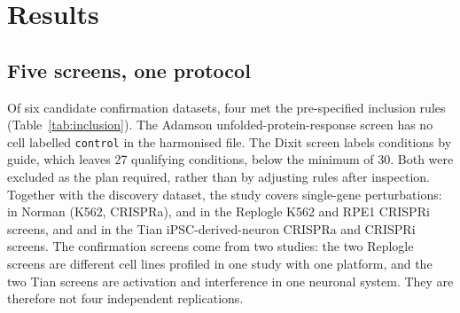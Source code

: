 \section{Results}

\subsection{Five screens, one protocol}
Of six candidate confirmation datasets, four met the pre-specified inclusion rules (Table~\ref{tab:inclusion}). The Adamson unfolded-protein-response screen has no cell labelled \texttt{control} in the harmonised file. The Dixit screen labels conditions by guide, which leaves 27 qualifying conditions, below the minimum of 30. Both were excluded as the plan required, rather than by adjusting rules after inspection. Together with the discovery dataset, the study covers \numNPerturbationsTotal{} single-gene perturbations: \numNNorman{} in Norman (K562, CRISPRa), \numNReplogleKEssential{} and \numNReplogleRpe{} in the Replogle K562 and RPE1 CRISPRi screens, and \numNTianCrispra{} and \numNTianCrispri{} in the Tian iPSC-derived-neuron CRISPRa and CRISPRi screens. The confirmation screens come from two studies: the two Replogle screens are different cell lines profiled in one study with one platform, and the two Tian screens are activation and interference in one neuronal system. They are therefore not four independent replications.

\begin{table}[t]
\centering\small
\caption{Datasets and pre-specified inclusion outcomes. Perturbations are single-gene conditions with enough cells whose target is a measured gene. Batches are 10x lanes or the dataset's batch annotation.}
\label{tab:inclusion}
\resizebox{\linewidth}{!}{}
\end{table}

